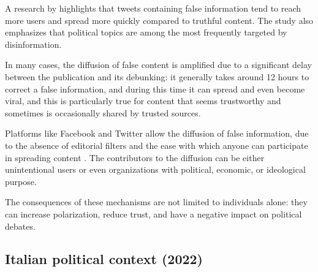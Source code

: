 \medskip
A research by \citet{kumar2018falseinformationwebsocial} highlights that tweets containing false information tend to reach more users and spread more quickly compared to truthful content. The study also emphasizes that political topics are among the most frequently targeted by disinformation.

In many cases, the diffusion of false content is amplified due to a significant delay between the publication and its debunking: it generally takes around 12 hours to correct a false information, and during this time it can spread and even become viral, and this is particularly true for content that seems trustworthy and sometimes is occasionally shared by trusted sources.

\medskip
Platforms like Facebook and Twitter allow the diffusion of false information, due to the absence of editorial filters and the ease with which anyone can participate in spreading content \cite{hilary2021social}.
The contributors to the diffusion can be either unintentional users or even organizations with political, economic, or ideological purpose.

The consequences of these mechanisms are not limited to individuals alone: they can increase polarization, reduce trust, and have a negative impact on political debates.









\subsection{Italian political context (2022)} %
